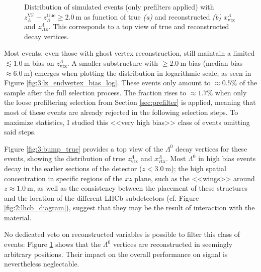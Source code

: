 \begin{figure}[t]
\begin{subfigure}{.45\textwidth}
		\caption{}
		\label{fig:3:bump_reco}
	\end{subfigure}
	\caption{Distribution of simulated \demonstratorshort events (only prefilters applied) with $z_\Lambda^\text{VF} - z_\Lambda^\text{true} \geq \SI{2.0}{\meter}$ as function of true \textit{(a)} and reconstructed \textit{(b)} $x^\Lambda_\text{vtx}$ and $z_\text{vtx}^\Lambda$. This corresponds to a top view of true and reconstructed \lz decay vertices.}
	\label{fig:3:bump}
\end{figure}

Most \demonstratorshort events, even those with ghost vertex reconstruction, still maintain a limited $\lesssim \SI{1.0}{\meter}$ bias on $z_\text{vtx}^\Lambda$.
A smaller substructure with $\geq \SI{2.0}{\meter}$ bias (median bias $\approx \SI{6.0}{\meter}$) emerges when plotting the distribution in logarithmic scale, as seen in Figure \ref{fig:3:lz_endvertex_bias_log}.
These events only amount to $\approx 0.5\%$ of the sample after the full selection process.
The fraction rises to $\approx 1.7\%$ when only the loose prefiltering selection from Section \ref{sec:prefilter} is applied, meaning that most of these events are already rejected in the following selection steps.
To maximize statistics, I studied this <<very high bias>> class of events omitting said steps.

Figure \ref{fig:3:bump_true} provides a top view of the $\Lambda^0$ decay vertices for these events, showing the distribution of true $z_\text{vtx}^\Lambda$ and $x_\text{vtx}^\Lambda$.
Most $\Lambda^0$ in high bias events decay in the earlier sections of the detector ($z<\SI{3.0}{\meter}$);
the high spatial concentration in specific regions of the $xz$ plane, such as the <<wings>> around $z\approx \SI{1.0}{\meter}$, as well as the consistency between the placement of these structures and the location of the different LHCb subdetectors (cf. Figure \ref{fig:2:lhcb_diagram}), suggest that they may be the result of interaction with the material.

No dedicated veto on reconstructed variables is possible to filter this class of events:
Figure \ref{fig:3:bump_reco} shows that the $\Lambda^0$ vertices are reconstructed in seemingly arbitrary positions.
Their impact on the overall performance on signal is nevertheless neglectable.